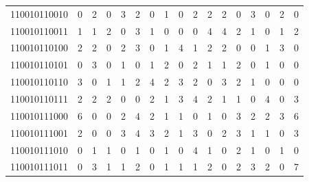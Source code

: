 \documentclass[10pt,a4paper]{article}
\begin{document}
\begin{longtable}{ |c|c|c|c|c|c|c|c|c|c|c|c|c|c|c|c|c| }
    110010110010              & 0                            & 2                                & 0                            & 3                              & 2   & 0   & 1   & 0   & 2   & 2   & 2   & 0   & 3   & 0   & 2   & 0   \\
    110010110011              & 1                            & 1                                & 2                            & 0                              & 3   & 1   & 0   & 0   & 0   & 4   & 4   & 2   & 1   & 0   & 1   & 2   \\
    110010110100              & 2                            & 2                                & 0                            & 2                              & 3   & 0   & 1   & 4   & 1   & 2   & 2   & 0   & 0   & 1   & 3   & 0   \\
    110010110101              & 0                            & 3                                & 0                            & 1                              & 0   & 1   & 2   & 0   & 2   & 1   & 1   & 2   & 0   & 1   & 0   & 0   \\
    110010110110              & 3                            & 0                                & 1                            & 1                              & 2   & 4   & 2   & 3   & 2   & 0   & 3   & 2   & 1   & 0   & 0   & 0   \\
    110010110111              & 2                            & 2                                & 2                            & 0                              & 0   & 2   & 1   & 3   & 4   & 2   & 1   & 1   & 0   & 4   & 0   & 3   \\
    110010111000              & 6                            & 0                                & 0                            & 2                              & 4   & 2   & 1   & 1   & 0   & 1   & 0   & 3   & 2   & 2   & 3   & 6   \\
    110010111001              & 2                            & 0                                & 0                            & 3                              & 4   & 3   & 2   & 1   & 3   & 0   & 2   & 3   & 1   & 1   & 0   & 3   \\
    110010111010              & 0                            & 1                                & 1                            & 0                              & 1   & 0   & 1   & 0   & 4   & 1   & 0   & 2   & 1   & 0   & 1   & 0   \\
    110010111011              & 0                            & 3                                & 1                            & 1                              & 2   & 0   & 1   & 1   & 1   & 2   & 0   & 2   & 3   & 2   & 0   & 7   \\

\end{longtable}
\end{document}
